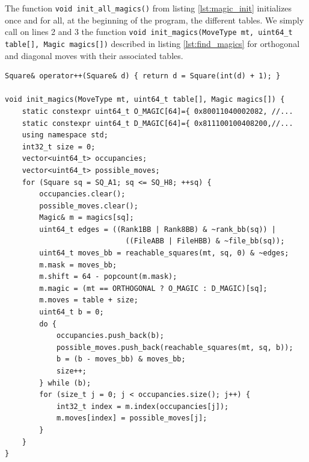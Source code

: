 \documentclass[12pt,a4paper,twoside,openright]{book}
\begin{document}
The function \texttt{void init_all_magics()} from listing \ref{lst:magic_init} initializes once and for all, at the beginning of the program, the different tables. We simply call on lines 2 and 3 the function \texttt{void init_magics(MoveType mt, uint64_t table[], Magic magics[])} described in listing \ref{lst:find_magics} for orthogonal and diagonal moves with their associated tables.\\ 

\begin{mdframed}[skipabove=\baselineskip,hidealllines=true]
\begin{verbatim}
Square& operator++(Square& d) { return d = Square(int(d) + 1); }

void init_magics(MoveType mt, uint64_t table[], Magic magics[]) {
    static constexpr uint64_t O_MAGIC[64]={ 0x80011040002082, //...
    static constexpr uint64_t D_MAGIC[64]={ 0x811100100408200,//...
    using namespace std;
    int32_t size = 0;
    vector<uint64_t> occupancies;
    vector<uint64_t> possible_moves;
    for (Square sq = SQ_A1; sq <= SQ_H8; ++sq) {
        occupancies.clear();
        possible_moves.clear();
        Magic& m = magics[sq];
        uint64_t edges = ((Rank1BB | Rank8BB) & ~rank_bb(sq)) | 
                            ((FileABB | FileHBB) & ~file_bb(sq));
        uint64_t moves_bb = reachable_squares(mt, sq, 0) & ~edges;
        m.mask = moves_bb;
        m.shift = 64 - popcount(m.mask);
        m.magic = (mt == ORTHOGONAL ? O_MAGIC : D_MAGIC)[sq];        
        m.moves = table + size;
        uint64_t b = 0;
        do {
            occupancies.push_back(b);
            possible_moves.push_back(reachable_squares(mt, sq, b));
            b = (b - moves_bb) & moves_bb;
            size++;
        } while (b);
        for (size_t j = 0; j < occupancies.size(); j++) {
            int32_t index = m.index(occupancies[j]);
            m.moves[index] = possible_moves[j];
        }
    }
}
\end{verbatim}
\label{lst:find_magics}
\end{mdframed} 
\end{document}
